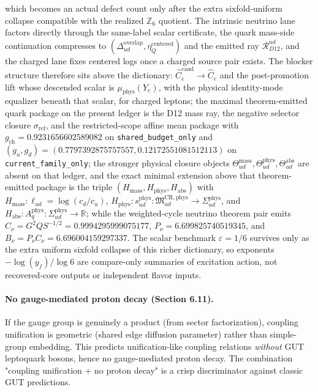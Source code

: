 which becomes an actual defect count only after the extra sixfold-uniform collapse compatible with the realized \(\mathbb Z_6\) quotient. The intrinsic neutrino lane factors directly through the same-label scalar certificate, the quark mass-side continuation compresses to \((\Delta_{ud}^{\mathrm{overlap}},\eta_Q^{\mathrm{centered}})\) and the emitted ray \(\mathcal R_{D12}^{ud}\), and the charged lane fixes centered logs once a charged source pair exists. The blocker structure therefore sits above the dictionary: \(\widehat C_e^{\mathrm{cand}}\to\widehat C_e\) and the post-promotion lift whose descended scalar is \(\mu_{\mathrm{phys}}(Y_e)\), with the physical identity-mode equalizer beneath that scalar, for charged leptons; the maximal theorem-emitted quark package on the present ledger is the D12 mass ray, the negative selector closure \(\sigma_{\mathrm{ref}}\), and the restricted-scope affine mean package with \(g_{\mathrm{ch}}=0.9231656602589082\) on \texttt{shared\_budget\_only} and \((g_u,g_d)=(0.7797392875757557,0.12172551081512113)\) on \texttt{current\_family\_only}; the stronger physical closure objects \(\Theta_{ud}^{\mathrm{mass}},\Theta_{ud}^{\mathrm{phys}},\Theta_{ud}^{\mathrm{abs}}\) are absent on that ledger, and the exact minimal extension above that theorem-emitted package is the triple \((H_{\mathrm{mass}},H_{\mathrm{phys}},H_{\mathrm{abs}})\) with \(H_{\mathrm{mass}}:\ell_{ud}=\log(c_d/c_u)\), \(H_{\mathrm{phys}}:s_{ud}^{\mathrm{phys}}:\mathfrak M_{ud}^{\mathrm{CR,phys}}\to\Sigma_{ud}^{\mathrm{phys}}\), and \(H_{\mathrm{abs}}:A_q^{\mathrm{phys}}:\Sigma_{ud}^{\mathrm{phys}}\to\mathbb R\); while the weighted-cycle neutrino theorem pair emits \(C_\nu=G^2Q S^{-1/2}=0.9994295999075177\), \(P_\nu=6.699825740519345\), and \(B_\nu=P_\nu C_\nu=6.696004159297337\). The scalar benchmark \(\varepsilon=1/6\) survives only as the extra uniform sixfold collapse of this richer dictionary, so exponents \(-\log(y_f)/\log 6\) are compare-only summaries of excitation action, not recovered-core outputs or independent flavor inputs.

\paragraph{No gauge-mediated proton decay (Section 6.11).} If the gauge group is genuinely a product (from sector factorization), coupling unification is geometric (shared edge diffusion parameter) rather than simple-group embedding. This predicts unification-like coupling relations \emph{without} GUT leptoquark bosons, hence no gauge-mediated proton decay. The combination "coupling unification + no proton decay" is a crisp discriminator against classic GUT predictions.

